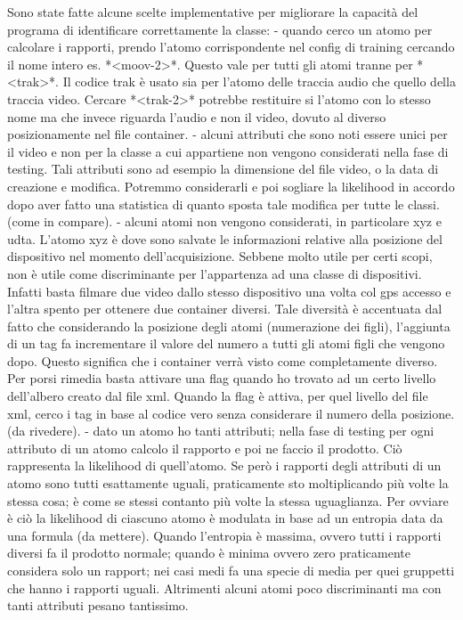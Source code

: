 Sono state fatte alcune scelte implementative per migliorare la capacità del programa di identificare correttamente la classe:
- quando cerco un atomo per calcolare i rapporti, prendo l'atomo corrispondente nel config di training cercando il nome intero es. *<moov-2>*. Questo vale per tutti gli atomi tranne per *<trak>*. Il codice trak è usato sia per l'atomo delle traccia audio che quello della traccia video. Cercare *<trak-2>* potrebbe restituire si l'atomo con lo stesso nome ma che invece riguarda l'audio e non il video, dovuto al diverso posizionamente nel file container.
- alcuni attributi che sono noti essere unici per il video e non per la classe a cui appartiene non vengono considerati nella fase di testing. Tali attributi sono ad esempio la dimensione del file video, o la data di creazione e modifica. Potremmo considerarli e poi sogliare la likelihood in accordo dopo aver fatto una statistica di quanto sposta tale modifica per tutte le classi. (come in compare).
- alcuni atomi non vengono considerati, in particolare xyz e udta. L'atomo xyz è dove sono salvate le informazioni relative alla posizione del dispositivo nel momento dell'acquisizione. Sebbene molto utile per certi scopi, non è utile come discriminante per l'appartenza ad una classe di dispositivi. Infatti basta filmare due video dallo stesso dispositivo una volta col gps accesso e l'altra spento per ottenere due container diversi. Tale diversità è accentuata dal fatto che considerando la posizione degli atomi (numerazione dei figli), l'aggiunta di un tag fa incrementare il valore del numero a tutti gli atomi figli che vengono dopo. Questo significa che i container verrà visto come completamente diverso. Per porsi rimedia basta attivare una flag quando ho trovato ad un certo livello dell'albero creato dal file xml. Quando la flag è attiva, per quel livello del file xml, cerco i tag in base al codice vero senza considerare il numero della posizione. (da rivedere).
- dato un atomo ho tanti attributi; nella fase di testing per ogni attributo di un atomo calcolo il rapporto e poi ne faccio il prodotto. Ciò rappresenta la likelihood di quell'atomo. Se però i rapporti degli attributi di un atomo sono tutti esattamente uguali, praticamente sto moltiplicando più volte la stessa cosa; è come se stessi contanto più volte la stessa uguaglianza. Per ovviare è ciò la likelihood di ciascuno atomo è modulata in base ad un entropia data da una formula (da mettere). Quando l'entropia è massima, ovvero tutti i rapporti diversi fa il prodotto normale; quando è minima ovvero zero praticamente considera solo un rapport; nei casi medi fa una specie di media per quei gruppetti che hanno i rapporti uguali. Altrimenti alcuni atomi poco discriminanti ma con tanti attributi pesano tantissimo.
